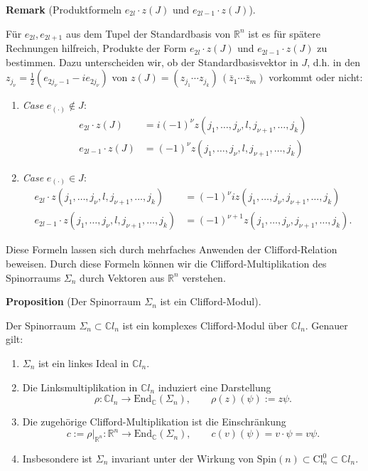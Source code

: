 \documentclass[10pt, letterpaper]{article}
\newcommand{\R}{\mathbb{R}}
\newcommand{\C}{\mathbb{C}}
\newcommand{\End}{\mathrm{End}}
\newcommand{\Cl}{\mathrm{Cl}}
\newcommand{\Spin}{\mathrm{Spin}}
\newcommand{\CustomHeading}[3]{%
  \par\medskip\noindent%
  \textbf{#1 #2} \textnormal{(#3)}.\enskip%
}
\newenvironment{PROP}[2]{\CustomHeading{Proposition}{#1}{#2}}{}
\newenvironment{REM}[2]{\CustomHeading{Remark}{#1}{#2}}{}
\begin{document}
\begin{REM}{}{Produktformeln $e_{2 l} \cdot z\left(J\right)$ und $e_{2 l-1} \cdot z\left(J\right)$}
  Für $e_{2l},e_{2l+1}$ aus dem Tupel der Standardbasis von $\R^n$ ist es für spätere Rechnungen hilfreich, Produkte der Form $e_{2 l} \cdot z\left(J\right)$ und $e_{2 l-1} \cdot z\left(J\right)$ zu bestimmen. Dazu unterscheiden wir, ob der Standardbasisvektor in $J$, d.h. in den $z_{j_\nu}=\frac{1}{2}\left(e_{2 j_\nu-1}-i e_{2 j_\nu}\right)$ von $z(J)=\left(z_{j_1}\cdots z_{j_k}\right)\,\left(\bar z_1\cdots \bar z_m\right)$ vorkommt oder nicht:
  \begin{enumerate}
    \item \emph{Case} $e_{(\cdot)}\notin J$: 
    $$
    \begin{aligned}
      e_{2 l} \cdot z\left(J\right) &=i(-1)^\nu z\left(j_1, \ldots, j_\nu, l, j_{\nu+1}, \ldots, j_k\right) \\
      e_{2 l-1} \cdot z\left(J\right) & = (-1)^\nu z\left(j_1, \ldots, j_\nu, l, j_{\nu+1}, \ldots, j_k\right)
    \end{aligned}
    $$
    \item \emph{Case} $e_{(\cdot)}\in J$: 
    $$
    \begin{aligned}
      e_{2 l} \cdot z\left(j_1, \ldots, j_\nu, l, j_{\nu+1}, \ldots, j_k\right)&=(-1)^\nu i z\left(j_1, \ldots, j_\nu, j_{\nu+1}, \ldots, j_k\right)\\
      e_{2 l-1} \cdot z\left(j_1, \ldots, j_\nu, l, j_{\nu+1}, \ldots, j_k\right)&=(-1)^{\nu+1} z\left(j_1, \ldots, j_\nu, j_{\nu+1}, \ldots, j_k\right) .
    \end{aligned}
    $$
  \end{enumerate}
  Diese Formeln lassen sich durch mehrfaches Anwenden der Clifford-Relation beweisen. Durch diese Formeln können wir die Clifford-Multiplikation des Spinorraums $\Sigma_n$ durch Vektoren aus $\R^n$ verstehen.

\end{REM}






\begin{PROP}{}{Der Spinorraum $\Sigma_n$ ist ein Clifford-Modul}
Der Spinorraum $\Sigma_n\subset \C l_n$ ist ein komplexes Clifford-Modul über
$\C l_n$. Genauer gilt:
\begin{enumerate}
    \item $\Sigma_n$ ist ein linkes Ideal in $\C l_n$.
    \item Die Linksmultiplikation in $\C l_n$ induziert eine Darstellung
    \[
    \rho:\C l_n\longrightarrow \End_{\C}(\Sigma_n),
    \qquad
    \rho(z)(\psi):=z\psi .
    \]
    \item Die zugehörige Clifford-Multiplikation ist die Einschränkung
    \[
    c:=\rho|_{\R^n}:\R^n\longrightarrow \End_{\C}(\Sigma_n),
    \qquad
    c(v)(\psi)=v\cdot\psi=v\psi .
    \]
    \item Insbesondere ist $\Sigma_n$ invariant unter der Wirkung von
    $\Spin(n)\subset \Cl_n^0\subset \C l_n$.
\end{enumerate}
\end{PROP}
\end{document}
